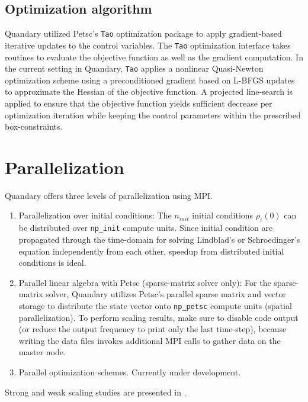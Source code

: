 \documentclass[11pt]{article}
\begin{document}
  \subsection{Optimization algorithm}
    Quandary utilized Petsc's \texttt{Tao} optimization package to apply gradient-based iterative updates to the control variables. The \texttt{Tao} optimization interface takes routines to evaluate the objective function as well as the gradient computation. In the current setting in Quandary, \texttt{Tao} applies a nonlinear Quasi-Newton optimization scheme using a preconditioned gradient based on L-BFGS updates to approximate the Hessian of the objective function. A projected line-search is applied to ensure that the objective function yields sufficient decrease per optimization iteration while keeping the control parameters within the prescribed box-constraints. 


    \section{Parallelization}
    Quandary offers three levels of parallelization using MPI. 
    \begin{enumerate}
    \item Parallelization over initial conditions: The $n_{init}$ initial conditions $\rho_i(0)$ can be distributed over \texttt{np\_init} compute units. Since initial condition are propagated through the time-domain for solving Lindblad's or Schroedinger's equation independently from each other, speedup from distributed initial conditions is ideal. 
    \item Parallel linear algebra with Petsc (sparse-matrix solver only): For the sparse-matrix solver, Quandary utilizes Petsc's parallel sparse matrix and vector storage to distribute the state vector onto \texttt{np\_petsc} compute units (spatial parallelization). To perform scaling results, make sure to disable code output (or reduce the output frequency to print only the last time-step), because writing the data files invokes additional MPI calls to gather data on the master node.
    \item Parallel optimization schemes. Currently under development.      
    \end{enumerate}
    Strong and weak scaling studies are presented in \cite{guenther2021quantum}.
\end{document}
